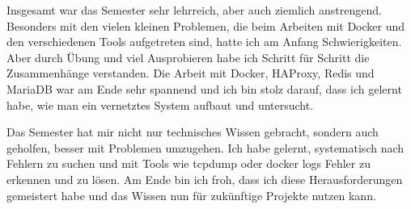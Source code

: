 Insgesamt war das Semester sehr lehrreich, aber auch ziemlich anstrengend. Besonders mit den vielen kleinen Problemen, die beim Arbeiten mit Docker und den verschiedenen Tools aufgetreten sind, hatte ich am Anfang Schwierigkeiten. Aber durch Übung und viel Ausprobieren habe ich Schritt für Schritt die Zusammenhänge verstanden. Die Arbeit mit Docker, HAProxy, Redis und MariaDB war am Ende sehr spannend und ich bin stolz darauf, dass ich gelernt habe, wie man ein vernetztes System aufbaut und untersucht.

Das Semester hat mir nicht nur technisches Wissen gebracht, sondern auch geholfen, besser mit Problemen umzugehen. Ich habe gelernt, systematisch nach Fehlern zu suchen und mit Tools wie tcpdump oder docker logs Fehler zu erkennen und zu lösen. Am Ende bin ich froh, dass ich diese Herausforderungen gemeistert habe und das Wissen nun für zukünftige Projekte nutzen kann.


